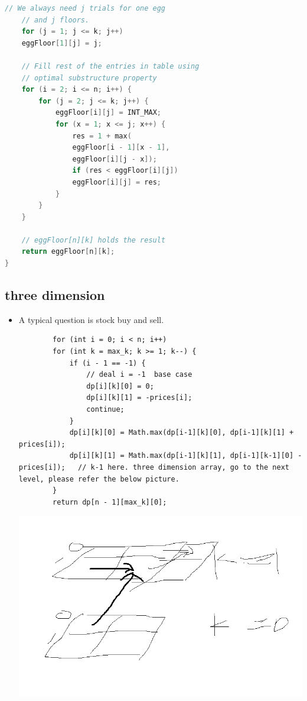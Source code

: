 \documentclass[a4paper,11pt,twoside]{book}
\begin{document}
\begin{itemize}
\begin{lstlisting}[frame=single, language=c++]
	// We always need j trials for one egg
	// and j floors.
	for (j = 1; j <= k; j++)
	eggFloor[1][j] = j;
	
	// Fill rest of the entries in table using
	// optimal substructure property
	for (i = 2; i <= n; i++) {
		for (j = 2; j <= k; j++) {
			eggFloor[i][j] = INT_MAX;
			for (x = 1; x <= j; x++) {
				res = 1 + max(
				eggFloor[i - 1][x - 1],
				eggFloor[i][j - x]);
				if (res < eggFloor[i][j])
				eggFloor[i][j] = res;
			}
		}
	}
	
	// eggFloor[n][k] holds the result
	return eggFloor[n][k];
}
\end{lstlisting}



\end{itemize}

\subsection{three dimension}
\begin{itemize}
	\item A typical question is stock buy and sell. 
	\begin{lstlisting}
		for (int i = 0; i < n; i++) 
		for (int k = max_k; k >= 1; k--) {
			if (i - 1 == -1) {
				// deal i = -1  base case
				dp[i][k][0] = 0;
				dp[i][k][1] = -prices[i];
				continue;
			}
			dp[i][k][0] = Math.max(dp[i-1][k][0], dp[i-1][k][1] + prices[i]);
			dp[i][k][1] = Math.max(dp[i-1][k][1], dp[i-1][k-1][0] - prices[i]);   // k-1 here. three dimension array, go to the next level, please refer the below picture.
		}
		return dp[n - 1][max_k][0];
	\end{lstlisting}
	
	\includegraphics[width=0.7\linewidth]{pics/stock.png} 
\end{itemize}
\end{document}

